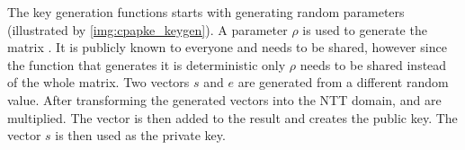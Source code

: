 The key generation functions starts with generating random parameters (illustrated by \ref{img:cpapke_keygen}). A parameter $\rho$ is used to generate the matrix . It is publicly known to everyone and needs to be shared, however since the function that generates it is deterministic only $\rho$ needs to be shared instead of the whole matrix. Two vectors $s$ and $e$ are generated from a different random value. After transforming the generated vectors into the NTT domain,  and  are multiplied. The vector  is then added to the result and creates the public key. The vector $s$ is then used as the private key.

